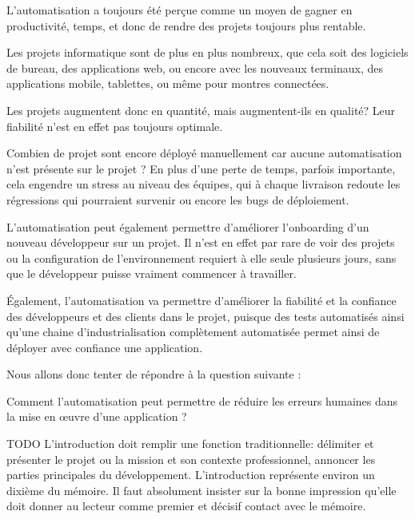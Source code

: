 \vfill


	L'automatisation a toujours été perçue comme un moyen de gagner en productivité, temps, et donc de rendre des projets toujours plus rentable.
	
	Les projets informatique sont de plus en plus nombreux, que cela soit des logiciels de bureau, des applications web, ou encore avec les nouveaux terminaux, des applications mobile, tablettes, ou même pour montres connectées.
	
	Les projets augmentent donc en quantité, mais augmentent-ils en qualité? Leur fiabilité n'est en effet pas toujours optimale. 
	
	Combien de projet sont encore déployé manuellement car aucune automatisation n'est présente sur le projet ? En plus d'une perte de temps, parfois importante, cela engendre un stress au niveau des équipes, qui à chaque livraison redoute les régressions qui pourraient survenir ou encore les bugs de déploiement.
	
	L'automatisation peut également permettre d'améliorer l'onboarding d'un nouveau développeur sur un projet. Il n'est en effet par rare de voir des projets ou la configuration de l'environnement requiert à elle seule plusieurs jours, sans que le développeur puisse vraiment commencer à travailler.
	
	Également, l'automatisation va permettre d'améliorer la fiabilité et la confiance des développeurs et des clients dans le projet, puisque des tests automatisés ainsi qu'une chaine d'industrialisation complètement automatisée permet ainsi de déployer avec confiance une application.
	
	Nous allons donc tenter de répondre à la question suivante : 
	
	Comment l'automatisation peut permettre de réduire les erreurs humaines dans la mise en œuvre d'une application ?
	
	
	TODO 
	L’introduction doit remplir une fonction traditionnelle: délimiter et présenter le projet ou la mission et son contexte professionnel, annoncer les parties principales du développement. L’introduction représente environ un dixième du mémoire. Il faut absolument insister sur la bonne impression qu’elle doit donner au lecteur comme premier et décisif contact avec le mémoire.
\vfill